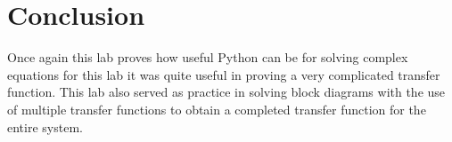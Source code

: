 \documentclass[12pt]{report}
\begin{document}
\section{Conclusion}
Once again this lab proves how useful Python can be for solving complex equations for this lab it was quite useful in proving a very complicated transfer function. This lab also served as practice in solving block diagrams with the use of multiple transfer functions to obtain a completed transfer function for the entire system. 
\newpage
\end{document}
